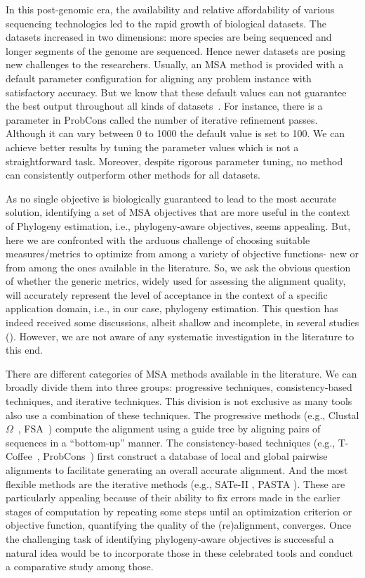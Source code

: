 In this post-genomic era, the availability and relative affordability of various sequencing technologies led to the rapid growth of biological datasets. The datasets increased in two dimensions: more species are being sequenced and longer segments of the genome are sequenced.
Hence newer datasets are posing new challenges to the researchers. Usually, an MSA method is provided with a default parameter configuration for aligning any problem instance with satisfactory accuracy. But we know that these default values can not guarantee the best output throughout all kinds of datasets~\citep{rubio2018characteristic}. For instance, there is a parameter in ProbCons called the number of iterative refinement passes. Although it can vary between 0 to 1000 the default value is set to 100. We can achieve better results by tuning the parameter values which is not a straightforward task. Moreover, despite rigorous parameter tuning, no method can consistently outperform other methods for all datasets.

As no single objective is biologically guaranteed to lead to the most accurate solution, identifying a set of MSA objectives that are more useful in the context of Phylogeny estimation, i.e., phylogeny-aware objectives, seems appealing. But, here we are confronted with the arduous challenge of choosing suitable measures/metrics to optimize from among a variety of objective functions- new or from among the ones available in the literature. So, we ask the obvious question of whether the generic metrics, widely used for assessing the alignment quality, will accurately represent the level of acceptance in the context of a specific application domain, i.e., in our case, phylogeny estimation. This question has indeed received some discussions, albeit shallow and incomplete, in several studies (\cite{mirarab2015pasta, liu2009rapid}). However, we are not aware of any systematic investigation in the literature to this end.

There are different categories of MSA methods available in the literature. We can broadly divide them into three groups: progressive techniques, consistency-based techniques, and iterative techniques. This division is not exclusive as many tools also use a combination of these techniques. The progressive methods (e.g., Clustal $\Omega$~\citep{sievers2011fast}, FSA~\citep{bradley2009fast}) compute the alignment using a guide tree by aligning pairs of sequences in a ``bottom-up'' manner. The consistency-based techniques (e.g., T-Coffee~\citep{notredame2000t}, ProbCons~\citep{do2005probcons}) first construct a database of local and global pairwise alignments to facilitate generating an overall accurate alignment.
And the most flexible methods are the iterative methods (e.g., SATe-II \cite{liu2012sate}, PASTA \cite{mirarab2015pasta}). These are particularly appealing because of their ability to fix errors made in the earlier stages of computation by repeating some steps until an optimization criterion or objective function, quantifying the quality of the (re)alignment, converges. Once the challenging task of identifying phylogeny-aware objectives is successful a natural idea would be to incorporate those in these celebrated tools and conduct a comparative study among those.

